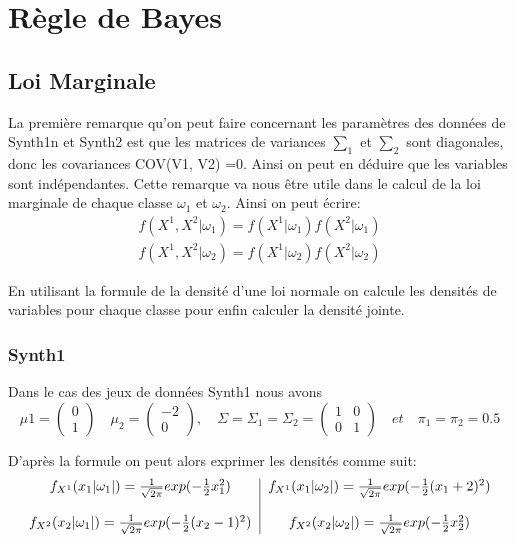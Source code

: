 \documentclass[10pt]{article}
\begin{document}
				
				
	
	\section{Règle de Bayes}
	\subsection{Loi Marginale}
	La première remarque qu'on peut faire concernant les paramètres des données de Synth1n et Synth2 est que les matrices de variances $\sum_{1}$ et $\sum_{2} $ sont diagonales, donc les covariances COV(V1, V2) =0. Ainsi on peut en déduire que les variables sont indépendantes. Cette remarque va nous être utile dans le calcul de la loi marginale de chaque classe $\omega_{1} $ et $ \omega_{2}$. Ainsi on peut écrire:
	\begin{equation}
	\begin{split}
		f(X^{1}, X^{2}| \omega_{1}) = f(X^{1}|\omega_{1})  f(X^{2}|\omega_{1})\\
		f(X^{1}, X^{2}| \omega_{2}) = f(X^{1}|\omega_{2})  f(X^{2}|\omega_{2})
		\end{split}
		\label{1}
	\end{equation}
	
En utilisant la formule de la densité d'une loi normale on calcule les densités de variables pour chaque classe pour enfin calculer la densité jointe.

\subsubsection{Synth1}
Dans le cas des jeux de données Synth1 nous avons \[\mu{1}= \begin{pmatrix} 0 \\ 1 \end{pmatrix} \quad \mu_{2}= \begin{pmatrix} -2 \\ 0 \end{pmatrix}, \quad  \Sigma = \Sigma_{1} = \Sigma_{2} = \begin{pmatrix} 1 & 0 \\ 0 & 1	\end{pmatrix} \quad et  \quad \pi_{1} = \pi_{2} = 0.5\]


D'après la formule   on peut alors exprimer les densités comme suit:\\
\begin{equation}
\begin{tabular}{c | c}
	$f_{X^{1}}(x_{1}|\omega_{1}|) = \frac{1}{\sqrt{2\pi}}exp(-\frac{1}{2} x_{1}^{2})$ & 	$f_{X^{1}}(x_{1}|\omega_{2}|) = \frac{1}{\sqrt{2\pi}}exp(-\frac{1}{2} (x_{1}+2)^{2})$\\\\
	$f_{X^{2}}(x_{2}|\omega_{1}|) = \frac{1}{\sqrt{2\pi}}exp(-\frac{1}{2} (x_{2}-1)^{2})$ & 	$f_{X^{2}}(x_{2}|\omega_{2}|) = \frac{1}{\sqrt{2\pi}}exp(-\frac{1}{2} x_{2}^{2})$\\
\end{tabular}
\label{3}
\end{equation}
\end{document}
